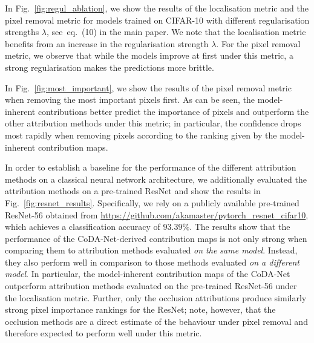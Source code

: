  In Fig.~\ref{fig:regul_ablation}, we show the results of the localisation metric and the pixel removal metric for models trained on CIFAR-10 with different regularisation strengths $\lambda$, see~eq.~(10) in the main paper. We note that the localisation metric benefits from an increase in the regularisation strength $\lambda$. For the pixel removal metric, we observe that while the models improve at first under this metric, a strong regularisation makes the predictions more brittle. 

 In Fig.~\ref{fig:most_important}, we show the results of the pixel removal metric when removing the most important pixels first. As can be seen, the model-inherent contributions better predict the importance of pixels and outperform the other attribution methods under this metric; in particular, the confidence drops most rapidly when removing pixels according to the ranking given by the model-inherent contribution maps.

In order to establish a baseline for the performance of the different attribution methods on a classical neural network architecture, we additionally evaluated the attribution methods on a pre-trained ResNet and show the results in Fig.~\ref{fig:resnet_results}. Specifically, we rely on a publicly available 
    pre-trained ResNet-56 obtained from
    \mbox{\url{https://github.com/akamaster/pytorch_resnet_cifar10}}, which achieves a classification accuracy of $93.39\%$. 
%
The results show that the performance of the CoDA-Net-derived contribution maps is not only strong when comparing them to attribution methods evaluated \emph{on the same model}. Instead, they also perform well in comparison to those methods evaluated \emph{on a different model}. In particular, the model-inherent contribution maps of the CoDA-Net outperform attribution methods evaluated on the pre-trained ResNet-56 under the localisation metric. Further, only the occlusion attributions produce similarly strong pixel importance rankings for the ResNet; note, however, that the occlusion methods are a direct estimate of the behaviour under pixel removal and therefore expected to perform well under this metric.
    